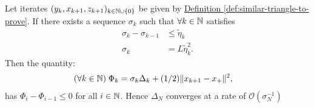 \documentclass[12pt]{article}
\begin{document}
    \begin{proposition}
        Let iterates $(y_k, x_{k + 1}, z_{k + 1})_{k \in \mathbb N\cup \{0\}}$ be given by 
        \hyperref[def:similar-triangle-to-prove]
        {Definition \ref*{def:similar-triangle-to-prove}}. 
        If there exists a sequence $\sigma_k$ such that $\forall k \in \mathbb N$ satisfies
        \begin{align*}
            \sigma_k - \sigma_{k - 1}&\le \tilde \eta_k 
            \\
            \sigma_k &= L\tilde \eta_k^2. 
        \end{align*}
        Then the quantity: 
        \begin{align*}
            (\forall k \in \mathbb N)\; 
            \Phi_k &= \sigma_k \Delta_k + (1/2) \Vert x_{k + 1} - x_+\Vert^2, 
        \end{align*}
        has $\Phi_{i} - \Phi_{i - 1} \le 0$ for all $i\in \mathbb N$.
        Hence $\Delta_N$ converges at a rate of $\mathcal O(\sigma_N^{-1})$
    \end{proposition}
\end{document}
